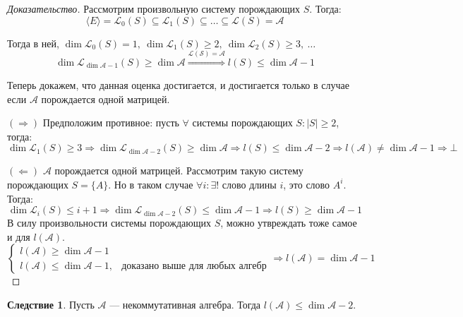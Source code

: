 \documentclass[a4paper, 14pt]{extarticle}
\theoremstyle{definition}
\newtheorem{conseq}{Следствие}
\begin{document}
\begin{proof}[Доказательство]
	Рассмотрим произвольную систему порождающих \(S\). Тогда:
	\[\langle E \rangle = \mathcal{L}_0(S) \subseteq \mathcal{L}_1(S) \subseteq \dots \subseteq \mathcal{L}(S) = \mathcal{A}\]
	
	Тогда в ней, \(\operatorname{dim} \mathcal{L}_0(S) = 1,\ \operatorname{dim} \mathcal{L}_1 (S) \geqslant 2,\ \operatorname{dim} \mathcal{L}_2 (S) \geqslant 3,\ \dots \)
	\[\operatorname{dim} \mathcal{L}_{\operatorname{dim} \mathcal{A} - 1} (S) \geqslant \operatorname{dim} \mathcal{A} \overset{\mathcal{L(S)} = \mathcal{A}}{\Rightarrow} l(S) \leqslant \operatorname{dim} \mathcal{A} - 1\]
	
	Теперь докажем, что данная оценка достигается, и достигается только в случае если \(\mathcal{A}\) порождается одной матрицей.
	
	\((\Rightarrow)\) Предположим противное: пусть \(\forall\) системы порождающих \(S: |S| \geqslant 2\), тогда:
	\[\operatorname{dim} \mathcal{L}_1 (S) \geqslant 3 \Rightarrow \operatorname{dim} \mathcal{L}_{\operatorname{dim} \mathcal{A} - 2} (S) \geqslant \operatorname{dim} \mathcal{A} \Rightarrow l(S) \leqslant \operatorname{dim} \mathcal{A} - 2 \Rightarrow l(\mathcal{A}) \neq \operatorname{dim} \mathcal{A} - 1 \Rightarrow \bot\]
	
	\((\Leftarrow)\) \(\mathcal{A}\) порождается одной матрицей. Рассмотрим такую систему порождающих \(S = \{A\}\). Но в таком случае \(\forall i: \exists!\) слово длины \(i\), это слово \(A^i\). Тогда:
	\[\operatorname{dim} \mathcal{L}_i(S) \leqslant i + 1 \Rightarrow \operatorname{dim} \mathcal{L}_{\operatorname{dim} \mathcal{A} - 2} (S) \leqslant \operatorname{dim} \mathcal{A} - 1 \Rightarrow l(S) \geqslant \operatorname{dim} \mathcal{A} - 1\]
	В силу произвольности системы порождающих \(S\), можно утвреждать тоже самое и для \(l(\mathcal{A})\).
	\[ \begin{cases}
		l(\mathcal{A}) \geqslant \operatorname{dim} \mathcal{A} - 1 \\
		l(\mathcal{A}) \leqslant \operatorname{dim} \mathcal{A} - 1, & \text{доказано выше для любых алгебр}
	\end{cases} \Rightarrow l(\mathcal{A}) = \operatorname{dim} \mathcal{A} - 1\]
\end{proof}

\begin{conseq}
	Пусть \(\mathcal{A}\) --- некоммутативная алгебра. Тогда \(l(\mathcal{A}) \leqslant \operatorname{dim} \mathcal{A} - 2\).
\end{conseq}
\end{document}
